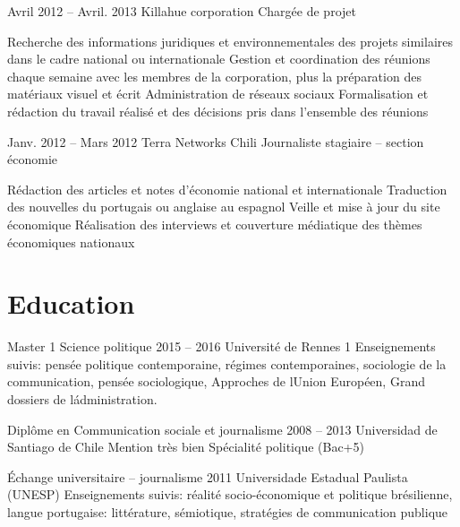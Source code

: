 \documentclass{tccv}
\begin{document}
\begin{eventlist}
\item{Avril 2012 -- Avril. 2013 }     
  {Killahue corporation}     
  {Chargée de projet}

\begin{itemize}
      \setlength\itemsep{0cm} 
      \cvitem[\checkmark] Recherche des informations juridiques et environnementales des projets similaires dans le cadre national ou internationale
      \cvitem[\checkmark] Gestion et coordination des réunions chaque semaine avec les membres de la corporation, plus la préparation des matériaux visuel et écrit
      \cvitem[\checkmark] Administration de réseaux sociaux 
      \cvitem[\checkmark] Formalisation et rédaction du travail réalisé et des décisions pris dans l’ensemble des réunions

\end{itemize}      
    

\item{Janv. 2012 -- Mars 2012 }     
  {Terra Networks Chili}     
  {Journaliste stagiaire – section économie}

\begin{itemize}
      \setlength\itemsep{0cm} 
      \cvitem[\checkmark] Rédaction des articles et notes d’économie national et internationale
      \cvitem[\checkmark] Traduction des nouvelles du portugais ou anglaise au espagnol
      \cvitem[\checkmark] Veille et mise à jour du site économique
      \cvitem[\checkmark] Réalisation des interviews et couverture médiatique des thèmes économiques nationaux

\end{itemize}        
   
   


\end{eventlist}



\section{Education}

\begin{yearlist}

\item[Master 1 Science politique]{2015 -- 2016}
     {Université de Rennes 1}
     {Enseignements suivis: pensée politique contemporaine, régimes contemporaines, sociologie de la communication, pensée sociologique, Approches de lUnion Européen, Grand dossiers de l\' administration.}


  

\item[Diplôme en Communication sociale et journalisme]{2008 -- 2013}
     {Universidad de Santiago de Chile}
     {Mention très bien
      Spécialité politique
      (Bac+5)}

     
\item[Échange universitaire -- journalisme]{2011}
     {Universidade Estadual Paulista (UNESP)}
     {Enseignements suivis: réalité socio-économique et politique brésilienne, langue portugaise: littérature, sémiotique, stratégies de communication publique}


\end{yearlist}
\end{document}
